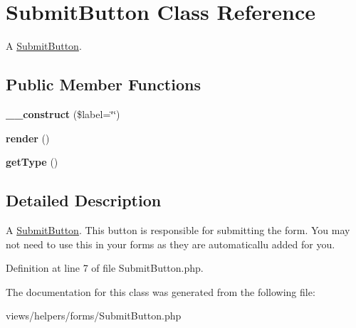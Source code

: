 \hypertarget{class_submit_button}{
\section{SubmitButton Class Reference}
\label{class_submit_button}
}


A \hyperlink{class_submit_button}{SubmitButton}.  


\subsection*{Public Member Functions}
\begin{DoxyCompactItemize}
\item 
\hypertarget{class_submit_button_a5323859d772bfd4a2f506b114d44aed4}{
{\bfseries \_\-\_\-construct} (\$label=\char`\"{}\char`\"{})}
\label{class_submit_button_a5323859d772bfd4a2f506b114d44aed4}

\item 
\hypertarget{class_submit_button_a29535d87e292b033f92073f820d7bb92}{
{\bfseries render} ()}
\label{class_submit_button_a29535d87e292b033f92073f820d7bb92}

\item 
\hypertarget{class_submit_button_a530805e42dfcad8ab3ca7d6d46576f23}{
{\bfseries getType} ()}
\label{class_submit_button_a530805e42dfcad8ab3ca7d6d46576f23}

\end{DoxyCompactItemize}


\subsection{Detailed Description}
A \hyperlink{class_submit_button}{SubmitButton}. This button is responsible for submitting the form. You may not need to use this in your forms as they are automaticallu added for you. 

Definition at line 7 of file SubmitButton.php.



The documentation for this class was generated from the following file:\begin{DoxyCompactItemize}
\item 
views/helpers/forms/SubmitButton.php\end{DoxyCompactItemize}

